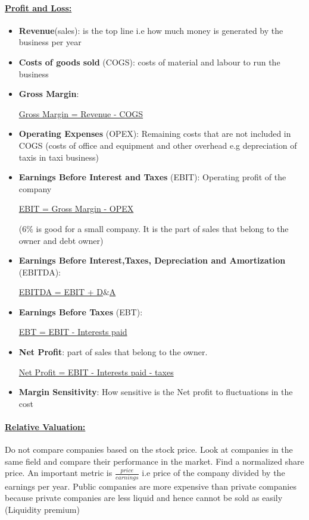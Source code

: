 \documentclass[8pt]{extreport}
\begin{document}
{\paragraph{\underline{Profit and Loss:}} 
\begin{itemize}
\item \textbf{Revenue}(sales): is the top line i.e how much money is generated by the business per year
\item \textbf{Costs of goods sold} (COGS): costs of material and labour to run the business
\item \textbf{Gross Margin}: 
\begin{center}
\underline{Gross Margin = Revenue - COGS}
\end{center}
\item \textbf{Operating Expenses} (OPEX): Remaining costs that are not included in COGS (costs of office and equipment and other overhead  e.g depreciation of taxis in taxi business)
\item \textbf{ Earnings Before Interest and Taxes} (EBIT): Operating profit of the company
\begin{center}
 \underline{EBIT = Gross Margin - OPEX}
\end {center}
 (6$\%$ is good for a small company. It is the part of sales that belong to the owner and debt owner)
\item \textbf{Earnings Before Interest,Taxes, Depreciation and Amortization} (EBITDA): 
\begin{center}
\underline{EBITDA = EBIT + D$\&$A}
\end{center}
\item \textbf{Earnings Before Taxes} (EBT):
\begin{center}
\underline{ EBT = EBIT - Interests paid}
\end{center} 
\item \textbf{Net Profit}: part of sales that belong to the owner.
\begin{center}
\underline{Net Profit = EBIT - Interests paid - taxes}
\end{center}
\item \textbf{Margin Sensitivity}: How sensitive is the Net profit to fluctuations in the cost
\end{itemize}
\paragraph{\underline{Relative Valuation:}} Do not compare companies based on the stock price. Look at companies in the same field and compare their performance in the market. Find a normalized share price. An important metric is $\frac{price}{earnings}$ i.e price of the company divided by the earnings per year. Public companies are more expensive than private companies because private companies are less liquid and hence cannot be sold as easily (Liquidity premium)
}
\end{document}
